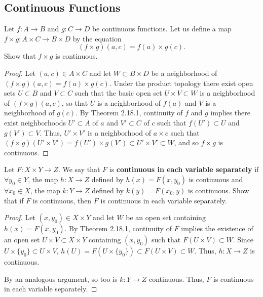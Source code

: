 \subsection{Continuous Functions}

\begin{exercise}[ID=2.18.10]
    Let $f: A \rightarrow B$ and $g: C \rightarrow D$ be continuous functions.
    Let us define a map $f \times g: A \times C \rightarrow B \times D$ by the equation
    $$ (f \times g)(a, c) = f(a) \times g(c).$$
    Show that $f \times g$ is continuous.
\end{exercise}

\begin{solution}
    \begin{proof}
        Let $(a, c) \in A \times C$ and let $W \subset B \times D$ be a neighborhood of $(f \times g)(a, c) = f(a) \times g(c)$.
        Under the product topology there exist open sets $U \subset B$ and $V \subset C$ such that the basic open set $U \times V \subset W$ is a neighborhood of $(f \times g)(a, c)$, so that $U$ is a neighborhood of $f(a)$ and $V$ is a neighborhood of $g(c)$.
        By Theorem 2.18.1, continuity of $f$ and $g$ implies there exist neighborhoods $U' \subset A$ of $a$ and $V' \subset C$ of $c$ such that $f(U') \subset U$ and $g(V') \subset V$.
        Thus, $U' \times V'$ is a neighborhood of $a \times c$ such that $(f \times g)(U' \times V') = f(U') \times g(V') \subset U' \times V' \subset W$, and so $f \times g$ is continuous.
    \end{proof}
\end{solution}
\newpage

\begin{exercise}[ID=2.18.11]
    Let $F: X \times Y \rightarrow Z$. We say that $F$ is {\bf continuous in each variable separately} if $\forall y_0 \in Y$, the map $h: X \rightarrow Z$ defined by $h(x) = F(x, y_0)$ is continuous and $\forall x_0 \in X$, the map $k: Y \rightarrow Z$ defined by $k(y) = F(x_0, y)$ is continuous.
    Show that if $F$ is continuous, then $F$ is continuous in each variable separately.
\end{exercise}

\begin{solution}
    \begin{proof}
        Let $(x, y_0) \in X \times Y$ and let $W$ be an open set containing $h(x) = F(x, y_0)$.
        By Theorem 2.18.1, continuity of $F$ implies the existence of an open set $U \times V \subset X \times Y$ containing $(x, y_0)$ such that $F(U \times V) \subset W$.
        Since $U \times \{y_0\} \subset U \times V$, $h(U) = F(U \times \{y_0\}) \subset F(U \times V) \subset W$.
        Thus, $h: X \rightarrow Z$ is continuous.

        By an analogous argument, so too is $k: Y \rightarrow Z$ continuous.
        Thus, $F$ is continuous in each variable separately.
    \end{proof}
\end{solution}
\newpage

